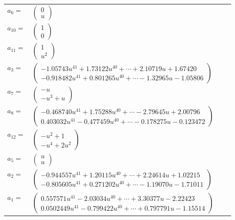 \documentclass[1p]{elsarticle_modified}
\theoremstyle{definition}
\begin{document}
\begin{tabular}{m{7pt} m{180pt} m{7pt} m{180pt} }
\flushright $a_{6}=$&$\begin{pmatrix}0\\u\end{pmatrix}$ \\
\flushright $a_{10}=$&$\begin{pmatrix}1\\0\end{pmatrix}$ \\
\flushright $a_{11}=$&$\begin{pmatrix}1\\u^2\end{pmatrix}$ \\
\flushright $a_{3}=$&$\begin{pmatrix}-1.05743 u^{41}+1.73122 u^{40}+\cdots+2.10719 u+1.67420\\-0.918482 u^{41}+0.801265 u^{40}+\cdots-1.32965 u-1.05806\end{pmatrix}$ \\
\flushright $a_{7}=$&$\begin{pmatrix}- u\\- u^3+u\end{pmatrix}$ \\
\flushright $a_{8}=$&$\begin{pmatrix}-0.468740 u^{41}+1.75288 u^{40}+\cdots-2.79645 u+2.00796\\0.403032 u^{41}-0.477459 u^{40}+\cdots-0.178275 u-0.123472\end{pmatrix}$ \\
\flushright $a_{12}=$&$\begin{pmatrix}- u^2+1\\- u^4+2 u^2\end{pmatrix}$ \\
\flushright $a_{5}=$&$\begin{pmatrix}u\\u\end{pmatrix}$ \\
\flushright $a_{2}=$&$\begin{pmatrix}-0.944557 u^{41}+1.20115 u^{40}+\cdots+2.24614 u+1.02215\\-0.805605 u^{41}+0.271202 u^{40}+\cdots-1.19070 u-1.71011\end{pmatrix}$ \\
\flushright $a_{1}=$&$\begin{pmatrix}0.557571 u^{41}-2.03034 u^{40}+\cdots+3.30377 u-2.22423\\0.0502449 u^{41}-0.799422 u^{40}+\cdots+0.797791 u-1.15514\end{pmatrix}$ \\

\end{tabular}
\end{document}
